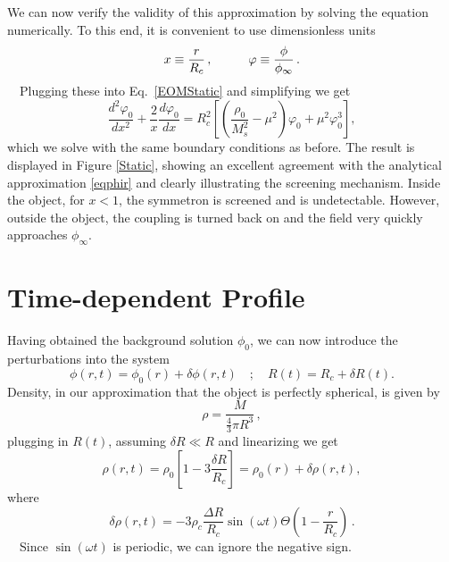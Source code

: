 \documentclass[nofootinbib,twocolumn]{revtex4}
\begin{document}
We can now verify the validity of this approximation by solving the equation numerically.
To this end, it is convenient to use dimensionless units
\begin{equation}
 x \equiv \frac{r}{R_c}\,, \hspace{10mm}    \varphi \equiv \frac{\phi}{\phi_{\infty}}\,.
\end{equation}
~~Plugging these into Eq.~\eqref{EOMStatic} and simplifying we get 
\begin{equation}
    \frac{d^2\varphi_0}{dx^2} + \frac{2}{x}\frac{d\varphi_0}{dx} = R_c^2\left[\left(\frac{\rho_0}{M_s^2}-\mu^2 \right)\varphi_0 +\mu^2\varphi_0^3\right],
\end{equation}
which we solve with the same boundary conditions as before. The result is displayed in Figure \ref{Static}, showing an excellent agreement with the analytical approximation \eqref{eqphir} and clearly illustrating the screening mechanism. 
Inside the object, for $x<1$, the symmetron is screened and is undetectable. However, outside the object, the coupling is turned back on and the field very quickly approaches $\phi_{\infty}$. 

\section{\label{sec4}Time-dependent Profile}

Having obtained the background solution $\phi_0$, we can now introduce the perturbations into the system
\begin{equation}
    \phi(r,t) = \phi_0(r) + \delta\phi(r,t)
    \quad\mathrm{;}\quad 
     R(t) = R_c + \delta R(t).
\end{equation}
Density, in our approximation that the object is perfectly spherical, is given by
\begin{equation}
\rho = \frac{M}{\frac{4}{3}\pi R^3}   \,, 
\end{equation}
plugging in $R(t)$, assuming $\delta R \ll R $ and linearizing we get
\begin{equation}
    \rho(r,t) =\rho_0\left[1-3\frac{\delta R}{R_c}\right] = \rho_0(r)+\delta\rho(r,t),
\end{equation}
where 
\begin{equation}
\delta\rho(r,t) = -3\rho_c\frac{\Delta R}{R_c} \sin(\omega t)\Theta(1-\frac{r}{R_c})\,.
\end{equation}
~~Since $\sin(\omega t)$ is periodic, we can ignore the negative sign.
\end{document}
